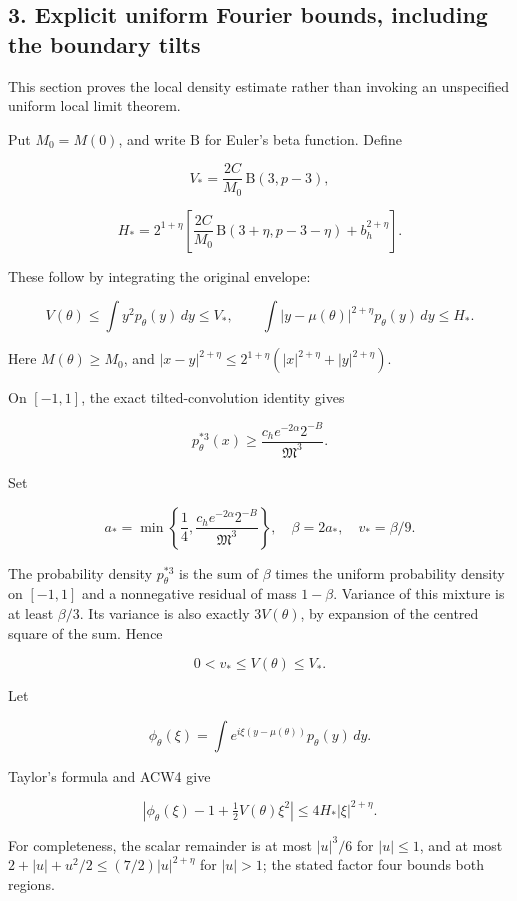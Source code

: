 \documentclass[11pt,a4paper]{article}
\begin{document}
\subsection{3. Explicit uniform Fourier bounds, including the boundary tilts}\label{acw:explicit-uniform-fourier-bounds-including-the-boundary-tilts}

This section proves the local density estimate rather than invoking an unspecified uniform local limit theorem.

Put \(M_0=M(0)\), and write \(\mathrm B\) for Euler's beta function. Define

\[
V_* = \frac{2C}{M_0}\,\mathrm B(3,p-3),
\]

\[
H_* = 2^{1+\eta}\left[
\frac{2C}{M_0}\,\mathrm B(3+\eta,p-3-\eta)
+b_h^{2+\eta}\right].
\tag{ACW4}
\]

These follow by integrating the original envelope:

\[
V(\theta)\le\int y^2p_\theta(y)\,dy\le V_*,
\qquad
\int|y-\mu(\theta)|^{2+\eta}p_\theta(y)\,dy\le H_*.
\]

Here \(M(\theta)\ge M_0\), and
\(|x-y|^{2+\eta}\le2^{1+\eta}(|x|^{2+\eta}+|y|^{2+\eta})\).

On \([-1,1]\), the exact tilted-convolution identity gives

\[
p_\theta^{*3}(x)\ge
\frac{c_h e^{-2\alpha}2^{-B}}{\mathfrak M^3}.
\]

Set

\[
a_* = \min\left\{\frac14,
\frac{c_h e^{-2\alpha}2^{-B}}{\mathfrak M^3}\right\},
\quad \beta=2a_*,\quad v_* = \beta/9.
\tag{ACW5}
\]

The probability density \(p_\theta^{*3}\) is the sum of \(\beta\) times the uniform probability density on \([-1,1]\) and a nonnegative residual of mass \(1-\beta\). Variance of this mixture is at least \(\beta/3\). Its variance is also exactly \(3V(\theta)\), by expansion of the centred square of the sum. Hence

\[
0<v_*\le V(\theta)\le V_*.
\]

Let

\[
\phi_\theta(\xi)=\int e^{i\xi(y-\mu(\theta))}p_\theta(y)\,dy.
\]

Taylor's formula and ACW4 give

\[
\left|\phi_\theta(\xi)-1+\tfrac12V(\theta)\xi^2\right|
\le4H_*|\xi|^{2+\eta}.
\tag{ACW6}
\]

For completeness, the scalar remainder is at most \(|u|^3/6\) for \(|u|\le1\), and at most \(2+|u|+u^2/2\le(7/2)|u|^{2+\eta}\) for \(|u|>1\); the stated factor four bounds both regions.
\end{document}
